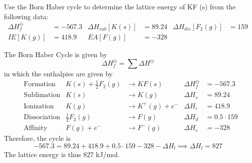 \documentclass[answers]{exam}
\begin{document}
\begin{questions}

\question Use the Born Haber cycle to determine the lattice energy of KF (s) from the following data:
\begin{align*}
  \Delta H_f^\ominus &= - 567.3 & \Delta H_{sub} [K(s)] &= 89.24 & \Delta H_{dis} [F_2(g)] &= 159 \\
  IE[K(g)] &= 418.9 & EA[F(g)] &= -328
\end{align*}
\begin{solutionbox}{3.2in}
  The Born Haber Cycle is given by \begin{equation*}
    \Delta H_f^\ominus = \sum \Delta H^\ominus
  \end{equation*}
  in which the enthalpies are given by
  \begin{align*}
    & \text{Formation} & K(s) + \textstyle\frac{1}{2} F_2(g) &\to KF(s) & \Delta H_f^\ominus &= -567.3 \\
    & \text{Sublimation} & K(s) &\to K(g) & \Delta H_s &= 89.24 \\
    & \text{Ionization} & K(g) &\to K^+(g) + e^- & \Delta H_i &= 418.9 \\
    & \text{Dissociation} & \textstyle\frac{1}{2} F_2 (g) &\to F(g) & \Delta H_d &= 0.5 \cdot 159 \\
    & \text{Affinity} & F(g) + e^- &\to F^- (g) & \Delta H_e &= -328
  \end{align*}
  Therefore, the cycle is \begin{equation*}
    -567.3 = 89.24 + 418.9 + 0.5 \cdot 159 - 328 - \Delta H_l \implies \Delta H_l = 827
  \end{equation*}
  The lattice energy is thus 827 kJ/mol.
\end{solutionbox}


\end{questions}
\end{document}
